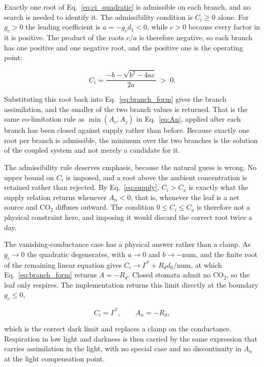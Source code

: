 Exactly one root of Eq.~\eqref{eq:ci_quadratic} is admissible on each branch, and
no search is needed to identify it. The admissibility condition is $C_i \geq 0$
alone. For $g_c > 0$ the leading coefficient is $a = -g_c d_1 < 0$, while $c > 0$
because every factor in it is positive. The product of the roots $c/a$ is
therefore negative, so each branch has one positive and one negative root, and the
positive one is the operating point:

\begin{equation}
C_i =
\frac{-b - \sqrt{b^{2} - 4ac}}{2a}
\;>\; 0 .
\label{eq:ci_root}
\end{equation}

Substituting this root back into Eq.~\eqref{eq:branch_form} gives the branch
assimilation, and the smaller of the two branch values is returned. That is the
same co-limitation rule as $\min(A_c,A_j)$ in Eq.~\eqref{eq:An}, applied after
each branch has been closed against supply rather than before. Because exactly one
root per branch is admissible, the minimum over the two branches is the solution
of the coupled system and not merely a candidate for it.

The admissibility rule deserves emphasis, because the natural guess is wrong. No
upper bound on $C_i$ is imposed, and a root above the ambient concentration is
retained rather than rejected. By Eq.~\eqref{eq:supply}, $C_i > C_a$ is exactly
what the supply relation returns whenever $A_n < 0$, that is, whenever the leaf is
a net source and CO$_2$ diffuses outward. The condition $0 \le C_i \le C_a$ is
therefore not a physical constraint here, and imposing it would discard the
correct root twice a day.

The vanishing-conductance case has a physical answer rather than a clamp. As
$g_c \to 0$ the quadratic degenerates, with $a \to 0$ and $b \to -\mathrm{num}$,
and the finite root of the remaining linear equation gives
$C_i \to \Gamma^{*} + R_d d_0/\mathrm{num}$, at which Eq.~\eqref{eq:branch_form}
returns $A = -R_d$. Closed stomata admit no CO$_2$, so the leaf only respires. The
implementation returns this limit directly at the boundary $g_c \leq 0$,

\begin{equation}
C_i = \Gamma^{*}, \qquad A_n = -R_d ,
\label{eq:ci_dark}
\end{equation}

which is the correct dark limit and replaces a clamp on the conductance.
Respiration in low light and darkness is then carried by the same expression that
carries assimilation in the light, with no special case and no discontinuity in
$A_n$ at the light compensation point.

